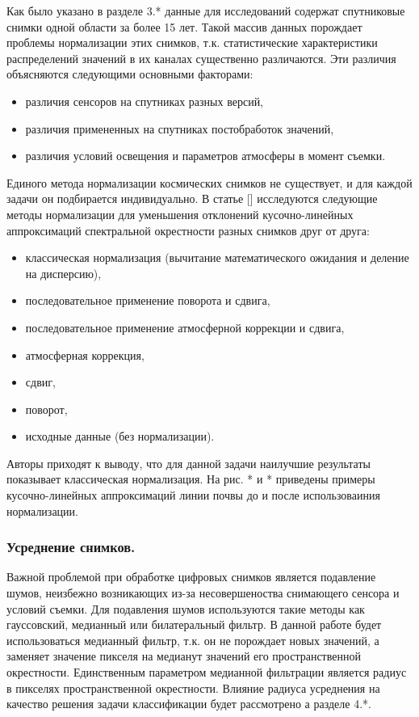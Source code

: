 \documentclass[12pt]{article}
\begin{document}
\par
Как было указано в разделе {\color{red} 3.*} данные для исследований содержат спутниковые снимки
одной области за более 15 лет. Такой массив данных порождает проблемы нормализации этих снимков,
т.к. статистические характеристики распределений значений в их каналах существенно различаются.
Эти различия объясняются следующими основными факторами:
\begin{itemize}
    \item различия сенсоров на спутниках разных версий,
    \item различия примененных на спутниках постобработок значений,
    \item различия условий освещения и параметров атмосферы в момент съемки.
\end{itemize}
\par
Единого метода нормализации космических снимков не существует, и для каждой задачи он
подбирается индивидуально. В статье {\color{red}[]} исследуются следующие методы нормализации
для уменьшения отклонений кусочно-линейных аппроксимаций спектральной окрестности 
разных снимков друг от друга:
\begin{itemize}
    \item классическая нормализация (вычитание математического ожидания и деление на дисперсию),
    \item последовательное применение поворота и сдвига,
    \item последовательное применение атмосферной коррекции и сдвига,
    \item атмосферная коррекция,
    \item сдвиг,
    \item поворот,
\item исходные данные (без нормализации).
\end{itemize}
Авторы приходят к выводу, что для данной задачи наилучшие результаты 
показывает классическая нормализация. На рис. {\color{red}* и *} приведены примеры
кусочно-линейных аппроксимаций линии почвы до и после использоваиния нормализации.

\subsubsection{Усреднение снимков.}

Важной проблемой при обработке цифровых снимков является подавление шумов,
неизбежно возникающих из-за несовершеноства снимающего сенсора и условий съемки.
Для подавления шумов используются такие методы как гауссовский, медианный или билатеральный
фильтр. В данной работе будет использоваться медианный фильтр, т.к. он не порождает новых значений,
а заменяет значение пикселя на медианут значений его пространственной окрестности.
Единственным параметром медианной фильтрации является радиус в пикселях пространственной
окрестности. Влияние радиуса усреднения на качество решения задачи классификации будет рассмотрено
а разделе {\color{red} 4.*}.
\end{document}

